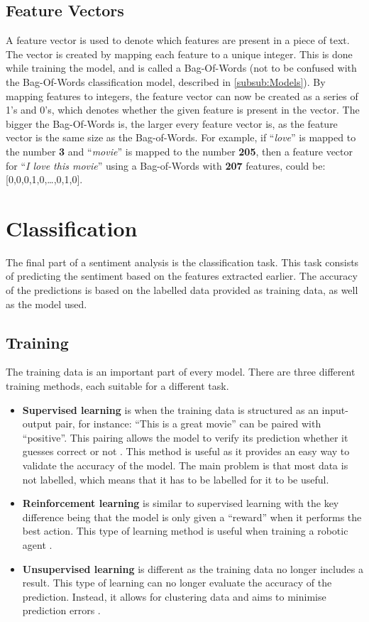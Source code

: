 \subsection{Feature Vectors}\label{sub:FeatureVector}
A feature vector is used to denote which features are present in a piece of
text. The vector is created by mapping each feature to a unique integer. This
is done while training the model, and is called a Bag-Of-Words (not to be
confused with the Bag-Of-Words classification model, described in
\autoref{subsub:Models}). 
By mapping features to integers, the feature vector can now be created as a
series of 1's and 0's, which denotes whether the given feature is present in
the vector. The bigger the Bag-Of-Words is, the larger every feature vector is,
as the feature vector is the same size as the Bag-of-Words.
For example, if ``\textit{love}'' is mapped to the number \textbf{3} and
``\textit{movie}'' is mapped to the number \textbf{205}, then a feature vector
for ``\textit{I love this movie}'' using a Bag-of-Words with \textbf{207}
features, could be: [0,0,0,1,0,\ldots,0,1,0].


\section{Classification}\label{sec:Class}
The final part of a sentiment analysis is the classification task. This task
consists of predicting the sentiment based on the features extracted earlier.
The accuracy of the predictions is based on the labelled data provided as
training data, as well as the model used.

\subsection{Training}\label{subsec:Train}
The training data is an important part of every model. There are three
different training methods, each suitable for a different task.

\begin{itemize}
  \item \textbf{Supervised learning} is when the training data is structured as
  an input-output pair, for instance: ``This is a great movie'' can be paired with
  ``positive''. This pairing allows the model to verify its prediction whether
  it guesses correct or not \citep[Ch. 7.0]{MIBook}. This method is useful as it
  provides an easy way to validate the accuracy of the model. The main problem
  is that most data is not labelled, which means that it has to be labelled for
  it to be useful.
  \item \textbf{Reinforcement learning} is similar to supervised learning with
  the key difference being that the model is only given a ``reward'' when it
  performs the best action. This type of learning method is useful when training
  a robotic agent \citep{Reinforcement}.
  \item \textbf{Unsupervised learning} is different as the training data no
  longer includes a result. This type of learning can no longer evaluate the
  accuracy of the prediction. Instead, it allows for clustering data and aims to
  minimise prediction errors \citep[Ch. 11.1]{MIBook}.
\end{itemize}

